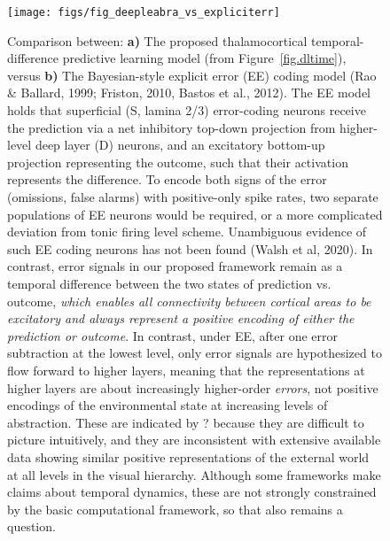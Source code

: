 \documentclass[11pt,twoside]{article}
\newif\myifpdf
\begin{document}
\begin{figure}
  \centering\texttt{[image: figs/fig\_deepleabra\_vs\_expliciterr]}
  \caption{\footnotesize Comparison between: {\bf a)} The proposed thalamocortical temporal-difference predictive learning model (from Figure~\ref{fig.dltime}), versus {\bf b)} The Bayesian-style explicit error (EE) coding model (Rao \& Ballard, 1999; Friston, 2010, Bastos et al., 2012).  The EE model holds that superficial (S, lamina 2/3) error-coding neurons receive the prediction via a net inhibitory top-down projection from higher-level deep layer (D) neurons, and an excitatory bottom-up projection representing the outcome, such that their activation represents the difference.  To encode both signs of the error (omissions, false alarms) with positive-only spike rates, two separate populations of EE neurons would be required, or a more complicated deviation from tonic firing level scheme.  Unambiguous evidence of such EE coding neurons has not been found (Walsh et al, 2020).  In contrast, error signals in our proposed framework remain as a temporal difference between the two states of prediction vs. outcome, \emph{which enables all connectivity between cortical areas to be excitatory and always represent a positive encoding of either the prediction or outcome}.  In contrast, under EE, after one error subtraction at the lowest level, only error signals are hypothesized to flow forward to higher layers, meaning that the representations at higher layers are about increasingly higher-order \emph{errors}, not positive encodings of the environmental state at increasing levels of abstraction.  These are indicated by ? because they are difficult to picture intuitively, and they are inconsistent with extensive available data showing similar positive representations of the external world at all levels in the visual hierarchy.  Although some frameworks make claims about temporal dynamics, these are not strongly constrained by the basic computational framework, so that also remains a question.}
  \label{fig.ee}
\end{figure}
\end{document}
